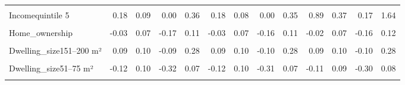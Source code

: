 \begin{table}
\begin{tabular}[t]{lrrrrrrrrrrrr}
\cellcolor{gray!10}{Incomequintile 4} & \cellcolor{gray!10}{0.13} & \cellcolor{gray!10}{0.09} & \cellcolor{gray!10}{-0.04} & \cellcolor{gray!10}{0.30} & \cellcolor{gray!10}{0.13} & \cellcolor{gray!10}{0.09} & \cellcolor{gray!10}{-0.04} & \cellcolor{gray!10}{0.30} & \cellcolor{gray!10}{0.89} & \cellcolor{gray!10}{0.36} & \cellcolor{gray!10}{0.19} & \cellcolor{gray!10}{1.65}\\
Incomequintile 5 & 0.18 & 0.09 & 0.00 & 0.36 & 0.18 & 0.08 & 0.00 & 0.35 & 0.89 & 0.37 & 0.17 & 1.64\\
\cellcolor{gray!10}{Higher\_edu} & \cellcolor{gray!10}{0.13} & \cellcolor{gray!10}{0.06} & \cellcolor{gray!10}{0.02} & \cellcolor{gray!10}{0.25} & \cellcolor{gray!10}{0.14} & \cellcolor{gray!10}{0.06} & \cellcolor{gray!10}{0.02} & \cellcolor{gray!10}{0.25} & \cellcolor{gray!10}{0.13} & \cellcolor{gray!10}{0.06} & \cellcolor{gray!10}{0.02} & \cellcolor{gray!10}{0.24}\\
Home\_ownership & -0.03 & 0.07 & -0.17 & 0.11 & -0.03 & 0.07 & -0.16 & 0.11 & -0.02 & 0.07 & -0.16 & 0.12\\
\cellcolor{gray!10}{Dwelling\_house} & \cellcolor{gray!10}{0.02} & \cellcolor{gray!10}{0.07} & \cellcolor{gray!10}{-0.12} & \cellcolor{gray!10}{0.16} & \cellcolor{gray!10}{0.02} & \cellcolor{gray!10}{0.07} & \cellcolor{gray!10}{-0.12} & \cellcolor{gray!10}{0.16} & \cellcolor{gray!10}{0.02} & \cellcolor{gray!10}{0.07} & \cellcolor{gray!10}{-0.12} & \cellcolor{gray!10}{0.17}\\
Dwelling\_size151–200 m² & 0.09 & 0.10 & -0.09 & 0.28 & 0.09 & 0.10 & -0.10 & 0.28 & 0.09 & 0.10 & -0.10 & 0.28\\
\cellcolor{gray!10}{Dwelling\_size26–50 m²} & \cellcolor{gray!10}{-0.10} & \cellcolor{gray!10}{0.12} & \cellcolor{gray!10}{-0.33} & \cellcolor{gray!10}{0.15} & \cellcolor{gray!10}{-0.10} & \cellcolor{gray!10}{0.12} & \cellcolor{gray!10}{-0.34} & \cellcolor{gray!10}{0.15} & \cellcolor{gray!10}{-0.09} & \cellcolor{gray!10}{0.12} & \cellcolor{gray!10}{-0.34} & \cellcolor{gray!10}{0.14}\\
Dwelling\_size51–75 m² & -0.12 & 0.10 & -0.32 & 0.07 & -0.12 & 0.10 & -0.31 & 0.07 & -0.11 & 0.09 & -0.30 & 0.08\\
\cellcolor{gray!10}{Dwelling\_size76–100 m²} & \cellcolor{gray!10}{-0.20} & \cellcolor{gray!10}{0.09} & \cellcolor{gray!10}{-0.37} & \cellcolor{gray!10}{-0.03} & \cellcolor{gray!10}{-0.20} & \cellcolor{gray!10}{0.09} & \cellcolor{gray!10}{-0.37} & \cellcolor{gray!10}{-0.03} & \cellcolor{gray!10}{-0.19} & \cellcolor{gray!10}{0.08} & \cellcolor{gray!10}{-0.35} & \cellcolor{gray!10}{-0.02}\\

\end{tabular}
\end{table}
